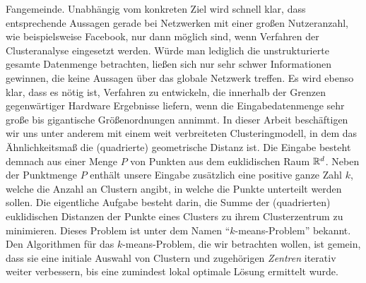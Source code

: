 Fangemeinde. Unabhängig vom konkreten Ziel wird schnell
klar, dass entsprechende Aussagen gerade bei Netzwerken mit einer großen Nutzeranzahl, wie beispielsweise Facebook, nur dann
möglich sind, wenn Verfahren der Clusteranalyse eingesetzt werden. Würde man lediglich die unstrukturierte gesamte Datenmenge
betrachten, ließen sich nur sehr schwer Informationen gewinnen, die keine Aussagen über das globale Netzwerk treffen. Es wird
ebenso klar, dass es nötig ist, Verfahren zu entwickeln, die innerhalb der Grenzen gegenwärtiger Hardware Ergebnisse liefern, wenn
die Eingabedatenmenge sehr große bis gigantische Größenordnungen annimmt.
\absatz
In dieser Arbeit beschäftigen wir uns unter anderem mit einem weit verbreiteten Clusteringmodell, in dem das Ähnlichkeitsmaß die
(quadrierte) geometrische Distanz ist. Die Eingabe besteht demnach aus einer Menge $P$ von Punkten aus dem euklidischen Raum
$\mathbb{R}^{d}$. Neben der Punktmenge $P$ enthält unsere Eingabe zusätzlich eine positive ganze Zahl $k$, welche die Anzahl an Clustern
angibt, in welche die Punkte unterteilt werden sollen. Die eigentliche Aufgabe besteht darin, die Summe der
(quadrierten) euklidischen Distanzen der Punkte eines Clusters zu ihrem Clusterzentrum zu minimieren.
Dieses Problem ist unter dem Namen "`$k$-means-Problem"' bekannt. Den Algorithmen für das $k$-means-Problem, die wir betrachten
wollen, ist gemein, dass sie eine initiale Auswahl von Clustern und zugehörigen \emph{Zentren} iterativ weiter verbessern,
bis eine zumindest lokal optimale Lösung ermittelt wurde.

